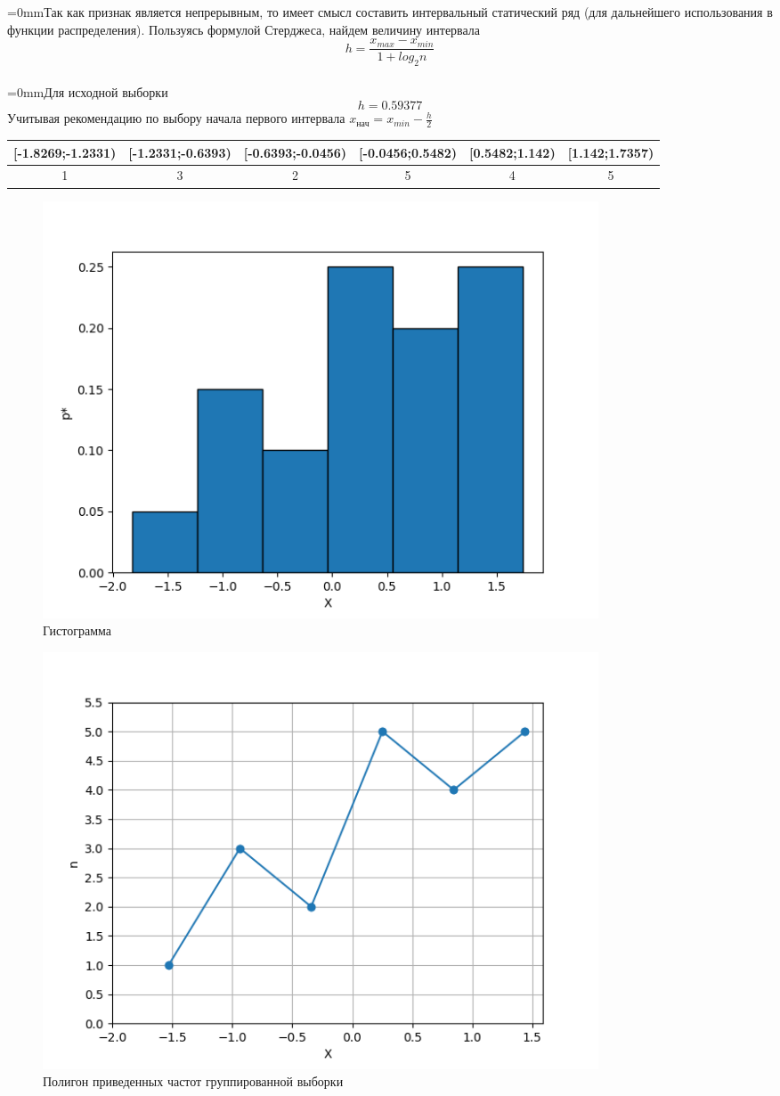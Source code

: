 \smallskip
\parindent=0mmТак как признак является непрерывным, то имеет смысл составить интервальный статический ряд (для дальнейшего использования в функции распределения). Пользуясь формулой Стерджеса, найдем величину интервала $$h = \frac{{x_{{max}} - x_{{min}}}}{{1 + log_2 n}}$$\\
\parindent=0mmДля исходной выборки $$h = 0.59377$$Учитывая рекомендацию по выбору начала первого интервала $x_{нач} = x_{min} - \frac{h}{2}$\\
\renewcommand{\arraystretch}{1.5}\begin{adjustbox}{max width=\textwidth}
\begin{tabular}{|c|c|c|c|c|c|}
\hline
{\large [-1.8269;-1.2331)} & {\large [-1.2331;-0.6393)} & {\large [-0.6393;-0.0456)} & {\large [-0.0456;0.5482)} & {\large [0.5482;1.142)} & {\large [1.142;1.7357)}\\
\hline
{\large 1} & {\large 3} & {\large 2} & {\large 5} & {\large 4} & {\large 5}\\
\hline
\end{tabular}
\end{adjustbox}
\begin {figure}[h]\centering\includegraphics[width=0.8\textwidth]{./out/bar_char.png}\caption{Гистограмма}\label{fig:my_label}\end{figure}
\begin {figure}[t]\centering\includegraphics[width=0.8\textwidth]{./out/frequency_polygon.png}\caption{Полигон приведенных частот группированной выборки}\label{fig:my_label}\end{figure}
